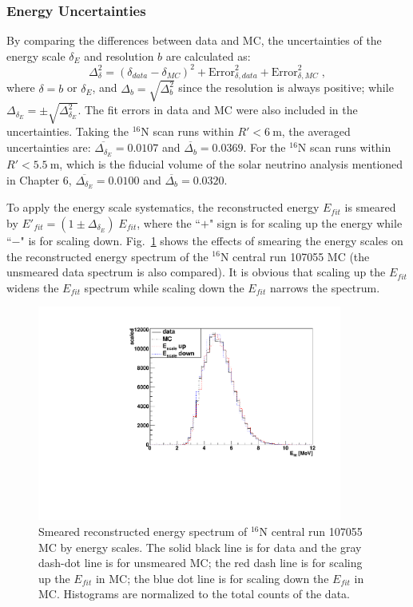 \subsubsection{Energy Uncertainties}\label{sect:eneryUncertianties}

By comparing the differences between data and MC, the uncertainties of the energy scale $\delta_E$ and resolution $b$ are calculated as:
\begin{equation}
\Delta^2_{\delta}= (\delta_{data}-\delta_{MC})^2+\mathrm{Error}^2_{\delta,data}+\mathrm{Error}^2_{\delta,MC}\; ,
\end{equation}
where $\delta=b$ or $\delta_E$, and $\Delta_b=\sqrt{\Delta^2_{b}}$ since the resolution is always positive; while $\Delta_{\delta_E}=\pm\sqrt{\Delta^2_{\delta_E}}$. The fit errors in data and MC were also included in the uncertainties. Taking the $^{16}$N scan runs within $R'<6~$m, the averaged uncertainties are: $\overline{\Delta_{\delta_E}}=0.0107$ and $\overline{\Delta_{b}}=0.0369$. For the $^{16}$N scan runs within $R'<5.5~\mathrm{m}$, which is the fiducial volume of the solar neutrino analysis mentioned in Chapter 6, $\overline{\Delta_{\delta_E}}=0.0100$ and $\overline{\Delta_{b}}=0.0320$.

To apply the energy scale systematics, the reconstructed energy $E_{fit}$ is smeared by $E'_{fit}=(1\pm\Delta_{\delta_E}) \; E_{fit}$, where the ``$+$" sign is for scaling up the energy while ``$-$" is for scaling down. Fig.~\ref{fig:EscaleSmear} shows the effects of smearing the energy scales on the reconstructed energy spectrum of the $^{16}$N central run 107055 MC (the unsmeared data spectrum is also compared). It is obvious that scaling up the $E_{fit}$ widens the $E_{fit}$ spectrum while scaling down the $E_{fit}$ narrows the spectrum. 

\begin{figure}
	\centering
	\includegraphics[width=10cm]{SmearedEscale_N16.pdf}
	\caption[Smeared reconstructed energy spectrum of $^{16}$N central run 107055 MC by energy scales.]{Smeared reconstructed energy spectrum of $^{16}$N central run 107055 MC by energy scales. The solid black line is for data and the gray dash-dot line is for unsmeared MC; the red dash line is for scaling up the $E_{fit}$ in MC; the blue dot line is for scaling down the $E_{fit}$ in MC. Histograms are normalized to the total counts of the data.\label{fig:EscaleSmear}}
\end{figure}

